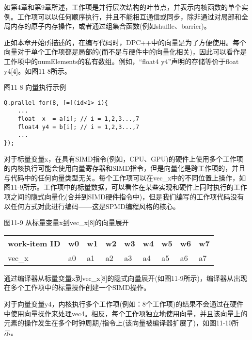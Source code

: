 如第4章和第9章所述，工作项是并行层次结构的叶节点，并表示内核函数的单个实例。工作项可以以任何顺序执行，并且不能相互通信或同步，除非通过对局部和全局内存的原子内存操作，或者通过组集合函数(例如shuffle、barrier)。\par

正如本章开始所描述的，在编写代码时，DPC++中的向量是为了方便使用。每个向量对于单个工作项都是局部的(而不是与硬件中的向量化相关)，因此可以看作是工作项中的numElements的私有数组。例如，“float4 y4”声明的存储等价于float y4[4]。如图11-8所示。\par

\hspace*{\fill} \par %
图11-8 向量执行示例
\begin{lstlisting}[caption={}]
Q.prallel_for(8, [=](id<1> i){
	...
	float  x  = a[i]; // i = 1,2,3...,7
	float4 y4 = b[i]; // i = 1,2,3...,7
	...
});
\end{lstlisting}

对于标量变量x，在具有SIMD指令(例如，CPU、GPU)的硬件上使用多个工作项的内核执行可能会使用向量寄存器和SIMD指令，但是向量化是跨工作项的，并且与代码中的任何向量类型无关。每个工作项可以在vec\_x中的不同位置上操作，如图11-9所示。工作项中的标量数据，可以看作在某些实现和硬件上同时执行的工作项之间的隐式向量化(合并到SIMD硬件指令中)，但是我们编写的工作项代码没有以任何方式对此进行编码——这是SPMD编程风格的核心。

\hspace*{\fill} \par %
图11-9 从标量变量x到vec\_x[8]的向量展开
\begin{table}[H]
	\begin{tabular}{|l|l|l|l|l|l|l|l|l|}
		\hline
		work-item ID & w0 & w1 & w2 & w3 & w4 & w5 & w6 & w7 \\ \hline
		vec\_x       & a0 & a1 & a2 & a3 & a4 & a5 & a6 & a7 \\ \hline
	\end{tabular}
\end{table}

通过编译器从标量变量x到vec\_x[8]的隐式向量展开(如图11-9所示)，编译器从出现在多个工作项中的标量操作创建一个SIMD操作。\par

对于向量变量y4，内核执行多个工作项(例如：8个工作项)的结果不会通过在硬件中使用向量操作来处理vec4。相反，每个工作项独立地使用向量，并且该向量上的元素的操作发生在多个时钟周期/指令上(该向量被编译器扩展了)，如图11-10所示。\par


